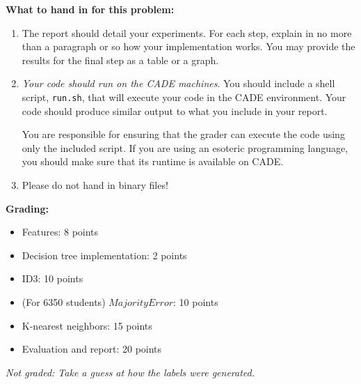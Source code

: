 {\bf What to hand in for this problem:}
\begin{enumerate}
\item The report should detail your experiments. For each step,
  explain in no more than a paragraph or so how your implementation
  works. You may provide the results for the final step as a table or
  a graph.

\item {\em Your code should run on the CADE machines}. You should
  include a shell script, {\tt run.sh}, that will execute your code
  in the CADE environment. Your code should produce similar output
  to what you include in your report.
  
  You are responsible for ensuring that the grader can execute the
  code using only the included script. If you are using an
  esoteric programming language, you should make sure that its
  runtime is available on CADE.

\item Please do not hand in binary files!

\end{enumerate}

{\bf Grading:}

\begin{itemize}
\item Features: 8 points
\item Decision tree implementation: 2 points
\item ID3: 10 points
\item (For 6350 students) $MajorityError$: 10 points
\item K-nearest neighbors: 15 points
\item Evaluation and report: 20 points
\end{itemize}

{\em Not graded: Take a guess at how the labels were generated.}

